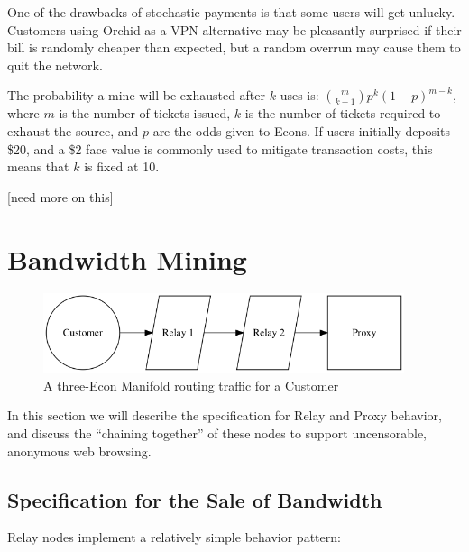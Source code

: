 \documentclass{article}
\newcommand{\mesh}{Orchid}
\begin{document}
One of the drawbacks of stochastic payments is that some users will get unlucky. Customers using \mesh{} as a VPN alternative may be pleasantly surprised if their bill is randomly cheaper than expected, but a random overrun may cause them to quit the network.

The probability a mine will be exhausted after $k$ uses is: $\binom{m}{k-1} p^{k} (1-p)^{m-k}$, where $m$ is the number of tickets issued, $k$ is the number of tickets required to exhaust the source, and $p$ are the odds given to Econs. If users initially deposits \$20, and a \$2 face value is commonly used to mitigate transaction costs, this means that $k$ is fixed at 10.

[need more on this]

\section{Bandwidth Mining}
\label{sec:mining}

\begin{figure}[htbp]
  \centering
  \includegraphics[width = 300pt]{sttc}
  \caption{A three-Econ Manifold routing traffic for a Customer}
\end{figure}

In this section we will describe the specification for Relay and Proxy
behavior, and discuss the ``chaining together'' of these nodes to
support uncensorable, anonymous web browsing.

\subsection{Specification for the Sale of Bandwidth}

Relay nodes implement a relatively simple behavior pattern:
\end{document}
